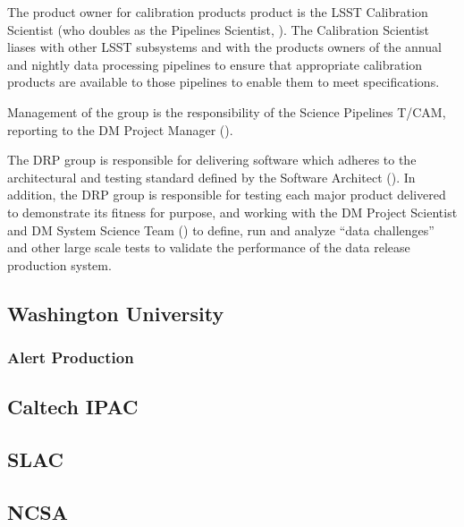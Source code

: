 The product owner for calibration products product is the LSST Calibration Scientist (who doubles as the Pipelines Scientist, ).
The Calibration Scientist liases with other LSST subsystems and with the products owners of the annual and nightly data processing pipelines to ensure that appropriate calibration products are available to those pipelines to enable them to meet specifications.

Management of the group is the responsibility of the Science Pipelines T/CAM, reporting to the DM Project Manager ().

The DRP group is responsible for delivering software which adheres to the architectural and testing standard defined by the Software Architect ().
In addition, the DRP group is responsible for testing each major product delivered to demonstrate its fitness for purpose, and working with the DM Project Scientist and DM System Science Team () to define, run and analyze ``data challenges'' and other large scale tests to validate the performance of the data release production system.

\subsection {Washington University}\label{sect:uw}

\subsubsection{Alert Production \label{sect:ap}}

\subsection {Caltech IPAC}\label{sect:ipac}
\subsection {SLAC}\label{sect:slac}
\subsection {NCSA}\label{sect:ncsa}

